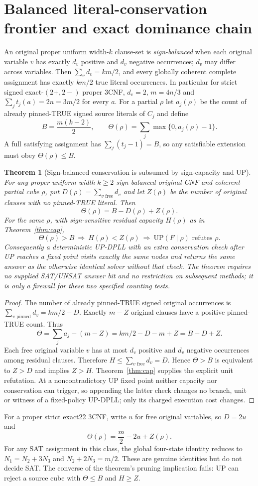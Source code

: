 \documentclass[10pt]{article}
\newtheorem{theorem}{Theorem}
\newcommand{\UP}{\mathrm{UP}}
\begin{document}
\section{Balanced literal-conservation frontier and exact dominance chain}
An original proper uniform width-$k$ clause-set is \emph{sign-balanced} when each original variable $v$ has exactly $d_v$ positive and $d_v$ negative occurrences; $d_v$ may differ across variables. Then $\sum_vd_v=km/2$, and every globally coherent complete assignment has exactly $km/2$ true literal occurrences. In particular for strict signed exact-$(2+,2-)$ proper 3CNF, $d_v=2$, $m=4n/3$ and $\sum_jt_j(a)=2n=3m/2$ for every $a$.
For a partial $\rho$ let $a_j(\rho)$ be the count of already pinned-TRUE signed source literals of $C_j$ and define
\[
B=\frac{m(k-2)}2,\qquad
\Theta(\rho)=\sum_j\max\{0,a_j(\rho)-1\}.
\]
A full satisfying assignment has $\sum_j(t_j-1)=B$, so any satisfiable extension must obey $\Theta(\rho)\le B$.

\begin{theorem}[Sign-balanced conservation is subsumed by sign-capacity and UP]\label{thm:dom}
For any proper uniform width-$k\ge2$ sign-balanced original CNF and coherent partial cube $\rho$, put $D(\rho)=\sum_{v\text{ free}}d_v$ and let $Z(\rho)$ be the number of original clauses with no pinned-TRUE literal. Then
\[
\boxed{\Theta(\rho)=B-D(\rho)+Z(\rho).}\]
For the same $\rho$, with sign-sensitive residual capacity $H(\rho)$ as in Theorem~\ref{thm:cap},
\[
\boxed{\Theta(\rho)>B\ \Longrightarrow\ H(\rho)<Z(\rho)
\ \Longrightarrow\ \UP(F\mid\rho)\text{ refutes }\rho.}
\]
Consequently a deterministic UP-DPLL with an extra conservation check \emph{after} UP reaches a fixed point visits exactly the same nodes and returns the same answer as the otherwise identical solver without that check. The theorem requires no supplied SAT/UNSAT answer bit and no restriction on subsequent methods; it is only a firewall for these two specified counting tests.
\end{theorem}
\begin{proof}
The number of already pinned-TRUE signed original occurrences is $\sum_{v\text{ pinned}}d_v=km/2-D$. Exactly $m-Z$ original clauses have a positive pinned-TRUE count. Thus
\[
\Theta=\sum_ja_j-(m-Z)=km/2-D-m+Z=B-D+Z.
\]
Each free original variable $v$ has at most $d_v$ positive and $d_v$ negative occurrences among residual clauses. Therefore $H\le\sum_{v\text{ free}}d_v=D$. Hence $\Theta>B$ is equivalent to $Z>D$ and implies $Z>H$. Theorem~\ref{thm:cap} supplies the explicit unit refutation. At a noncontradictory UP fixed point neither capacity nor conservation can trigger, so appending the latter check changes no branch, unit or witness of a fixed-policy UP-DPLL; only its charged execution cost changes.
\end{proof}
For a proper strict exact22 3CNF, write $u$ for free original variables, so $D=2u$ and
\[
\boxed{\Theta(\rho)=\frac m2-2u+Z(\rho).}
\]
For any SAT assignment in this class, the global four-state identity reduces to $N_1=N_2+3N_3$ and $N_2+2N_3=m/2$. These are genuine identities but do not decide SAT. The converse of the theorem's pruning implication fails: UP can reject a source cube with $\Theta\le B$ and $H\ge Z$.
\end{document}
